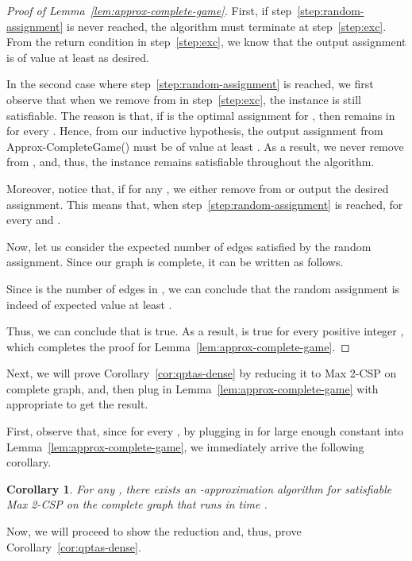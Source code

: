 \documentclass{article}
\newtheorem{corollary}{Corollary}
\begin{document}
\begin{proof}[Proof of Lemma~\ref{lem:approx-complete-game}]
First, if step~\ref{step:random-assignment} is never reached, the algorithm must terminate at step~\ref{step:exc}. From the return condition in step~\ref{step:exc}, we know that the output assignment is of value at least  as desired.

In the second case where step~\ref{step:random-assignment} is reached, we first observe that when we remove  from  in step~\ref{step:exc}, the instance is still satisfiable. The reason is that, if  is the optimal assignment for , then  remains in  for every . Hence, from our inductive hypothesis, the output assignment from {\sc Approx-CompleteGame}() must be of value at least . As a result, we never remove  from , and, thus, the instance remains satisfiable throughout the algorithm.

Moreover, notice that, if  for any , we either remove  from  or output the desired assignment. This means that, when step~\ref{step:random-assignment} is reached,  for every  and .

Now, let us consider the expected number of edges satisfied by the random assignment. Since our graph  is complete, it can be written as follows.



Since  is the number of edges in , we can conclude that the random assignment is indeed of expected value at least .

Thus, we can conclude that  is true. As a result,  is true for every positive integer , which completes the proof for Lemma~\ref{lem:approx-complete-game}.
\end{proof}

Next, we will prove Corollary~\ref{cor:qptas-dense} by reducing it to {\sc Max 2-CSP} on complete graph, and, then plug in Lemma~\ref{lem:approx-complete-game} with appropriate  to get the result.

First, observe that, since  for every , by plugging in  for large enough constant  into Lemma~\ref{lem:approx-complete-game}, we immediately arrive the following corollary. \\

\begin{corollary} \label{cor:qptas-complete}
  For any , there exists an -approximation algorithm for satisfiable {\sc Max 2-CSP} on the complete graph that runs in time .
\end{corollary}

Now, we will proceed to show the reduction and, thus, prove Corollary~\ref{cor:qptas-dense}.
\end{document}
